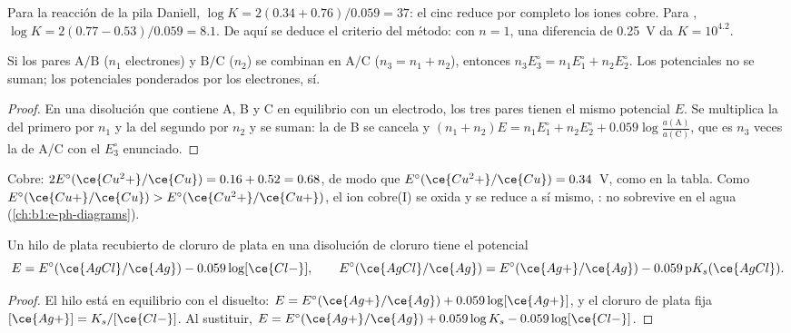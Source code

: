 Para la reacción de la pila Daniell, $\log K = 2(0.34 + 0.76)/0.059 = 37$:
el cinc reduce por completo los iones cobre. Para
,
$\log K = 2(0.77 - 0.53)/0.059 = 8.1$. De aquí se deduce el criterio del
método: con $n = 1$, una diferencia de \qty{0.25}{V} da $K = 10^{4.2}$.

\begin{proposition}\label{prop:b1:nernst:combined-potentials}
Si los pares $\mathrm{A}/\mathrm{B}$ ($n_1$ electrones) y
$\mathrm{B}/\mathrm{C}$ ($n_2$) se combinan en $\mathrm{A}/\mathrm{C}$
($n_3 = n_1 + n_2$), entonces $n_3 E^\circ_3 = n_1 E^\circ_1 + n_2 E^\circ_2$.
Los potenciales no se suman; los potenciales ponderados por los
electrones, sí.
\end{proposition}

\begin{proof}
En una disolución que contiene A, B y C en equilibrio con un electrodo,
los tres pares tienen el mismo potencial $E$. Se multiplica la  del primero por $n_1$ y la del segundo por $n_2$ y se suman: la
 de B se cancela y $(n_1 + n_2)E = n_1E^\circ_1 + n_2E^\circ_2 +
0.059\log\frac{a(\mathrm{A})}{a(\mathrm{C})}$, que es $n_3$ veces la
 de A/C con el $E^\circ_3$ enunciado.
\end{proof}

Cobre: $2E^\circ(\ce{Cu^2+}/\ce{Cu}) = 0.16 + 0.52 = 0.68$, de modo que
$E^\circ(\ce{Cu^2+}/\ce{Cu}) = 0.34$~V, como en la tabla. Como
$E^\circ(\ce{Cu+}/\ce{Cu}) > E^\circ(\ce{Cu^2+}/\ce{Cu+})$, el ion
cobre(I) se oxida y se reduce a sí mismo, : no
sobrevive en el agua (\cref{ch:b1:e-ph-diagrams}).

\begin{proposition}\label{prop:b1:nernst:second-kind}
Un hilo de plata recubierto de cloruro de plata en una disolución de
cloruro tiene el potencial
\[
  E = E^\circ(\ce{AgCl}/\ce{Ag}) - 0.059\log[\ce{Cl-}], \qquad
  E^\circ(\ce{AgCl}/\ce{Ag}) = E^\circ(\ce{Ag+}/\ce{Ag}) - 0.059\,\mathrm{p}K_s(\ce{AgCl}) .
\]
\end{proposition}

\begin{proof}
El hilo está en equilibrio con el  disuelto:
$E = E^\circ(\ce{Ag+}/\ce{Ag}) + 0.059\log[\ce{Ag+}]$, y el cloruro de
plata fija $[\ce{Ag+}] = K_s/[\ce{Cl-}]$. Al sustituir,
$E = E^\circ(\ce{Ag+}/\ce{Ag}) + 0.059\log K_s - 0.059\log[\ce{Cl-}]$.
\end{proof}


